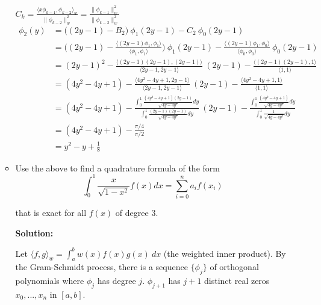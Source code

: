 \documentclass[a4paper,11pt]{report}
\begin{document}
\begin{enumerate}
\begin{itemize}
    $C_{k} = \displaystyle \frac{\langle x \phi_{k-1}, \phi_{k-2} \rangle_{w}}{\| \phi_{k-2} \|_{w}^{2}} = \frac{\| \phi_{k-1} \|_{w}^{2}}{\| \phi_{k-2} \|_{w}^{2}}$
    \begin{equation*}
    \begin{aligned}
    \phi_{2}(y) &= \big((2y-1) - B_{2}\big)\ \phi_{1}(2y-1) - C_{2}\ \phi_{0}(2y-1) \\
                &= \bigg((2y-1) - \frac{\langle (2y-1) \phi_{1}, \phi_{1} \rangle}{\langle \phi_{1}, \phi_{1} \rangle}\bigg)\ \phi_{1}(2y-1) - \frac{\langle (2y-1) \phi_{1}, \phi_{0} \rangle}{\langle \phi_{0}, \phi_{0} \rangle}\ \phi_{0}(2y-1) \\
                &= (2y-1)^2 - \frac{\langle (2y-1)(2y-1), (2y-1) \rangle}{\langle 2y-1, 2y-1 \rangle}\ (2y-1) - \frac{\langle (2y-1)(2y-1), 1 \rangle}{\langle 1, 1 \rangle} \\
                &= (4y^2 - 4y + 1) - \frac{\langle 4y^2 - 4y + 1, 2y-1 \rangle}{\langle 2y-1, 2y-1 \rangle}\ (2y-1) - \frac{\langle 4y^2 - 4y + 1, 1 \rangle}{\langle 1, 1 \rangle} \\
                &= (4y^2 - 4y + 1) - \frac{\displaystyle \int_{0}^{1} \frac{(4y^2 - 4y + 1)(2y-1)}{\sqrt{4y-4y^2}} dy}{\displaystyle \int_{0}^{1} \frac{(2y-1)(2y-1)}{\sqrt{4y-4y^2}} dy}\ (2y-1) - \frac{\displaystyle \int_{0}^{1} \frac{(4y^2 - 4y + 1)}{\sqrt{4y-4y^2}} dy}{\displaystyle \int_{0}^{1} \frac{1}{\sqrt{4y-4y^2}} dy} \\
                &= (4y^2 - 4y + 1) - \displaystyle \frac{\pi/4}{\pi/2} \\
                &= y^2 - y + \frac{1}{8}
    \end{aligned}
    \end{equation*}
    
        \item Use the above to find a quadrature formula of the form
            \begin{equation*}
            \int_{0}^{1} \frac{x}{\sqrt{1 - x^{2}}} f(x) dx = \sum_{i=0}^{n} a_{i} f(x_{i})
            \end{equation*}

        that is exact for all $f(x)$ of degree $3$.

   \textbf{Solution:} 

    Let $\langle f, g \rangle_{w} = \displaystyle \int_{a}^{b} w(x) f(x) g(x)\ dx$ (the weighted inner product). By the Gram-Schmidt process, there is a sequence
    $\{\phi_{j}\}$ of orthogonal polynomials where $\phi_{j}$ has degree $j$. $\phi_{j+1}$ has $j+1$ distinct real zeros $x_{0}, ..., x_{n}$ in $[a, b]$. 


\end{itemize}
\end{enumerate}
\end{document}
